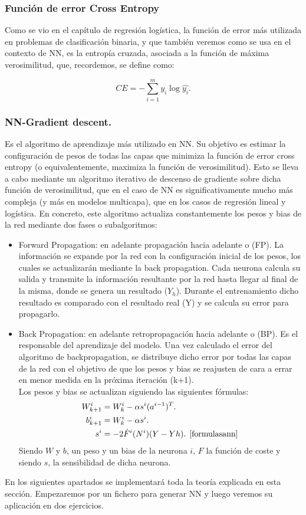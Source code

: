 \documentclass[a4paper,11pt]{article}
\begin{document}
\subsubsection{Función de error Cross Entropy}
Como se vio en el capítulo de regresión logística, la función de error más
utilizada en problemas de clasificación binaria, y que también veremos como se
usa en el contexto de NN, es la entropía cruzada, asociada a la función de máxima
verosimilitud, que, recordemos, se define como:

\begin{equation}
CE=-\sum_{i=1}^m y_i \log\hat{y_i}.
\end{equation}
\subsubsection{NN-Gradient descent.}
Es el algoritmo de aprendizaje más utilizado en NN. Su objetivo es estimar
la configuración de pesos de todas las capas que minimiza la función de error
cross entropy (o equivalentemente, maximiza la función de verosimilitud). Esto
se lleva a cabo mediante un algoritmo iterativo de descenso de gradiente sobre
dicha función de verosimilitud, que en el caso de NN es significativamente mucho
más compleja (y más en modelos multicapa), que en los casos de regresión lineal
y logística. En concreto, este algoritmo actualiza constantemente los pesos y bias
de la red mediante dos fases o subalgoritmos:

\begin{itemize}
    \item Forward Propagation: en adelante propagación hacia adelante o (FP). La información se expande por la red con la configuración inicial de los pesos, los cuales se actualizarán mediante la back propagation. Cada neurona calcula su salida y transmite la información resultante por la red hasta llegar al final de la misma, donde se genera un resultado ($Y_h$). Durante el entrenamiento dicho resultado es comparado con el resultado real (Y) y se calcula su error para propagarlo.
    \item Back Propagation: en adelante retropropagación hacia adelante o (BP). Es el responsable del aprendizaje del modelo. Una vez calculado el error del algoritmo de backpropagation, se distribuye dicho error por todas las capas de la red con el objetivo de que los pesos y bias se reajusten de cara a errar en menor medida en la próxima iteración (k+1). \\Los pesos y bias se actualizan siguiendo las siguientes fórmulas:
    \begin{align}
    W_{k+1}^i &= W_{k}^i  - \alpha s^i (a^{i-1})^T.\\
    b_{k+1}^i&= W_{k}^i  - \alpha s^i.\\
    s^i &= -2\dot{F}^i(N^i)(Y-Yh). \hspace{0.15cm}\cite{formulasann}
    \end{align}
    Siendo $W$ y $b$, un peso y un bias de la neurona $i$, $F$ la función de coste y siendo $s$, la sensibilidad de dicha neurona.
\end{itemize}
\noindent
En los siguientes apartados se implementará toda la teoría explicada en esta sección. Empezaremos por un fichero para generar NN y luego veremos su aplicación en dos ejercicios.
\end{document}
